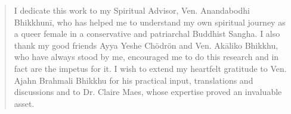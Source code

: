 \clearpage
\thispagestyle{empty}
\bigskip
\bigskip
\bigskip
\bigskip
\begin{quote}
\small I dedicate this work to my Spiritual Advisor, Ven. Anandabodhi Bhikkhunī, who has helped me to understand my own spiritual journey as a queer female in a conservative and patriarchal Buddhist Sangha. I also thank my good friends Ayya Yeshe Chödrön and Ven. Akāliko Bhikkhu, who have always stood by me, encouraged me to do this research and in fact are the impetus for it. I wish to extend my heartfelt gratitude to Ven. Ajahn Brahmali Bhikkhu for his practical input, translations and discussions and to Dr. Claire Maes, whose expertise proved an invaluable asset.
\end{quote}
\normalsize